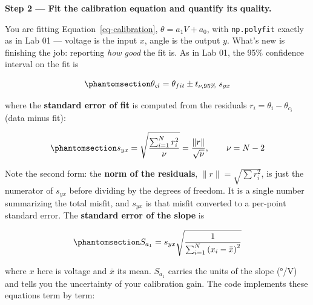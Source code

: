 \documentclass[
  12pt,
  letterpaper,
]{article}
\begin{document}
\textbf{Step 2 --- Fit the calibration equation and quantify its
quality.}

You are fitting Equation~\ref{eq-calibration}, \(\theta = a_1 V + a_0\),
with \texttt{np.polyfit} exactly as in Lab 01 --- voltage is the input
\(x\), angle is the output \(y\). What's new is finishing the job:
reporting \emph{how good} the fit is. As in Lab 01, the 95\% confidence
interval on the fit is

\begin{equation}\protect\phantomsection\label{eq-confidence-level}{\theta_{cl} = \theta_{fit} \pm t_{\nu,95\%} \; s_{yx}}\end{equation}

where the \textbf{standard error of fit} is computed from the residuals
\(r_i = \theta_i - \theta_{c_i}\) (data minus fit):

\begin{equation}\protect\phantomsection\label{eq-standard-error-fit}{s_{yx} = \sqrt{\frac{\sum_{i=1}^{N} r_i^2}{\nu}} = \frac{\lVert r \rVert}{\sqrt{\nu}}, \qquad \nu = N - 2}\end{equation}

Note the second form: the \textbf{norm of the residuals},
\(\lVert r \rVert = \sqrt{\sum r_i^2}\), is just the numerator of
\(s_{yx}\) before dividing by the degrees of freedom. It is a single
number summarizing the total misfit, and \(s_{yx}\) is that misfit
converted to a per-point standard error. The \textbf{standard error of
the slope} is

\begin{equation}\protect\phantomsection\label{eq-slope-std-error}{S_{a_1} = s_{yx} \sqrt{\frac{1}{\sum_{i=1}^{N}\left(x_i - \bar{x}\right)^2}}}\end{equation}

where \(x\) here is voltage and \(\bar{x}\) its mean. \(S_{a_1}\)
carries the units of the slope (°/V) and tells you the uncertainty of
your calibration gain. The code implements these equations term by term:
\end{document}
